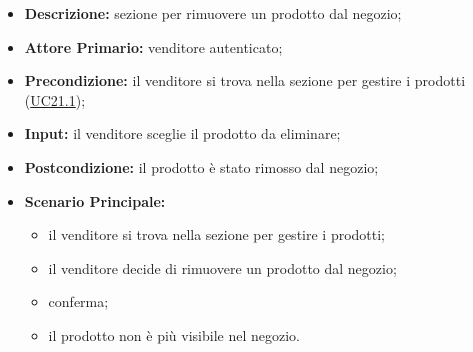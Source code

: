         \begin{itemize}
            \item \textbf{Descrizione:} sezione per rimuovere un prodotto dal negozio;
            \item \textbf{Attore Primario:} venditore autenticato;
            \item \textbf{Precondizione:} il venditore si trova nella sezione per gestire i prodotti (\hyperref[sec:UC21.1]{UC21.1});
            \item \textbf{Input:} il venditore sceglie il prodotto da eliminare;
            \item \textbf{Postcondizione:} il prodotto è stato rimosso dal negozio;
            \item \textbf{Scenario Principale:} 
                \begin{itemize}
                    \item il venditore si trova nella sezione per gestire i prodotti;
                    \item il venditore decide di rimuovere un prodotto dal negozio;
                    \item conferma;
                    \item il prodotto non è più visibile nel negozio.
                \end{itemize}
        \end{itemize}



